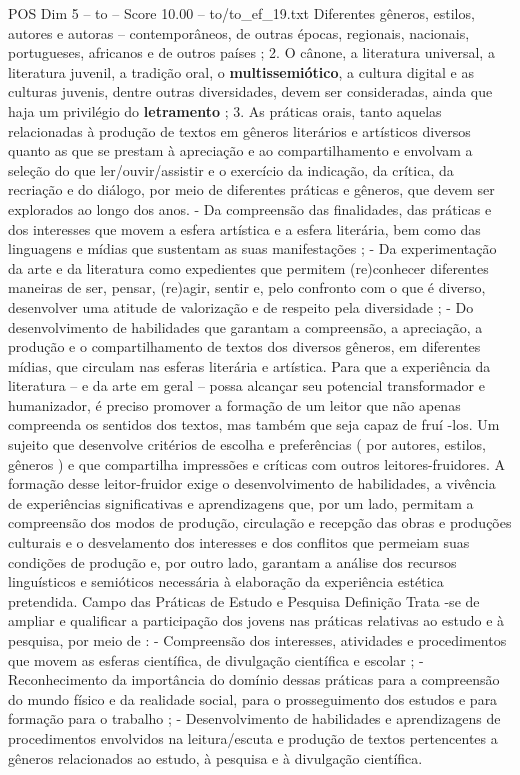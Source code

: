 \begin{textsample}{POS Dim 5 – to – Score 10.00 – to/to\_ef\_19.txt}
Diferentes gêneros, estilos, autores e autoras – contemporâneos, de outras épocas, regionais, nacionais, portugueses, africanos e de outros países ; 2.
O cânone, a literatura universal, a literatura juvenil, a tradição oral, o \textbf{multissemiótico}, a cultura digital e as culturas juvenis, dentre outras diversidades, devem ser consideradas, ainda que haja um privilégio do \textbf{letramento} ; 3.
As práticas orais, tanto aquelas relacionadas à produção de textos em gêneros literários e artísticos diversos quanto as que se prestam à apreciação e ao compartilhamento e envolvam a seleção do que ler/ouvir/assistir e o exercício da indicação, da crítica, da recriação e do diálogo, por meio de diferentes práticas e gêneros, que devem ser explorados ao longo dos anos. - Da compreensão das finalidades, das práticas e dos interesses que movem a esfera artística e a esfera literária, bem como das linguagens e mídias que sustentam as suas manifestações ; - Da experimentação da arte e da literatura como expedientes que permitem (re)conhecer diferentes maneiras de ser, pensar, (re)agir, sentir e, pelo confronto com o que é diverso, desenvolver uma atitude de valorização e de respeito pela diversidade ; - Do desenvolvimento de habilidades que garantam a compreensão, a apreciação, a produção e o compartilhamento de textos dos diversos gêneros, em diferentes mídias, que circulam nas esferas literária e artística.
Para que a experiência da literatura – e da arte em geral – possa alcançar seu potencial transformador e humanizador, é preciso promover a formação de um leitor que não apenas compreenda os sentidos dos textos, mas também que seja capaz de fruí -los.
Um sujeito que desenvolve critérios de escolha e preferências ( por autores, estilos, gêneros ) e que compartilha impressões e críticas com outros leitores-fruidores.
A formação desse leitor-fruidor exige o desenvolvimento de habilidades, a vivência de experiências significativas e aprendizagens que, por um lado, permitam a compreensão dos modos de produção, circulação e recepção das obras e produções culturais e o desvelamento dos interesses e dos conflitos que permeiam suas condições de produção e, por outro lado, garantam a análise dos recursos linguísticos e semióticos necessária à elaboração da experiência estética pretendida.
Campo das Práticas de Estudo e Pesquisa Definição Trata -se de ampliar e qualificar a participação dos jovens nas práticas relativas ao estudo e à pesquisa, por meio de : - Compreensão dos interesses, atividades e procedimentos que movem as esferas científica, de divulgação científica e escolar ; - Reconhecimento da importância do domínio dessas práticas para a compreensão do mundo físico e da realidade social, para o prosseguimento dos estudos e para formação para o trabalho ; - Desenvolvimento de habilidades e aprendizagens de procedimentos envolvidos na leitura/escuta e produção de textos pertencentes a gêneros relacionados ao estudo, à pesquisa e à divulgação científica.

\end{textsample}

